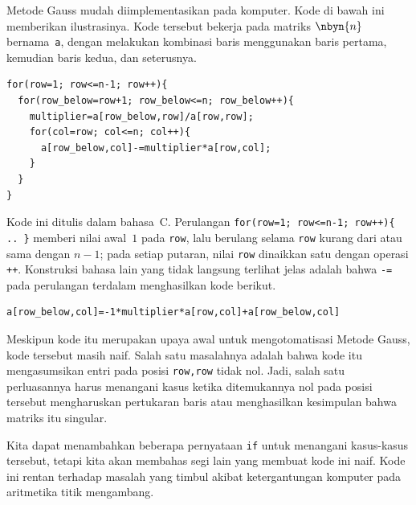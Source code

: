 Metode Gauss mudah diimplementasikan pada komputer.
Kode di bawah ini memberikan ilustrasinya.
Kode tersebut bekerja pada matriks $\nbyn{n}$ bernama~\lstinline[style=inline]!a!, 
dengan melakukan kombinasi baris menggunakan baris pertama, kemudian
baris kedua, dan seterusnya.
\begin{lstlisting}
for(row=1; row<=n-1; row++){
  for(row_below=row+1; row_below<=n; row_below++){
    multiplier=a[row_below,row]/a[row,row];
    for(col=row; col<=n; col++){
      a[row_below,col]-=multiplier*a[row,col];
    }
  }
}
\end{lstlisting}
Kode ini ditulis dalam bahasa~C.
Perulangan 
\lstinline[style=inline]!for(row=1; row<=n-1; row++){ .. }!
memberi nilai awal~$1$ pada \lstinline[style=inline]!row!, lalu berulang selama
\lstinline[style=inline]!row! kurang dari atau sama dengan $n-1$; pada setiap
putaran, nilai \lstinline[style=inline]!row! dinaikkan satu dengan operasi 
\lstinline[style=inline]!++!.
Konstruksi bahasa lain yang tidak langsung terlihat jelas adalah bahwa
\lstinline[style=inline]!-=! pada perulangan terdalam menghasilkan kode berikut.
\begin{lstlisting}[breaklines=true]
a[row_below,col]=-1*multiplier*a[row,col]+a[row_below,col]
\end{lstlisting}

Meskipun kode itu merupakan upaya awal untuk mengotomatisasi Metode Gauss,
kode tersebut masih naif.
Salah satu masalahnya adalah bahwa kode itu mengasumsikan entri pada posisi
\lstinline[style=inline]!row,row! tidak nol.
Jadi, salah satu perluasannya harus menangani kasus ketika ditemukannya nol
pada posisi tersebut mengharuskan pertukaran baris atau menghasilkan
kesimpulan bahwa matriks itu singular.

Kita dapat menambahkan beberapa pernyataan \lstinline[style=inline]!if! untuk
menangani kasus-kasus tersebut, tetapi kita akan membahas segi lain yang
membuat kode ini naif.
Kode ini rentan terhadap masalah yang timbul akibat ketergantungan komputer
pada aritmetika titik mengambang.


